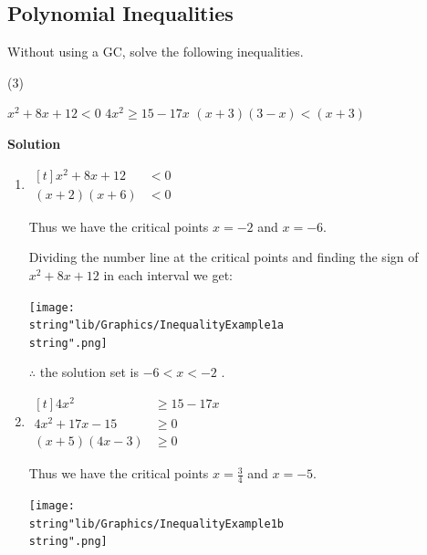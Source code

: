 \documentclass[11pt,a4paper]{book}
\begin{document}
\newpage

\subsection{Polynomial Inequalities}

\begin{example}{}

Without using a GC, solve the following inequalities.

\begin{tasks}[label=(\alph*),label-width=3.5ex](3)

\task $x^{2}+8x+12<0$
\task $4x^{2}\geq15-17x$
\task $\left(x+3\right)\left(3-x\right)<\left(x+3\right)$

\end{tasks}

\textbf{Solution}

\begin{enumerate}[label=(\alph*)]

\item

$
\begin{aligned}[t]
x^{2}+8x+12 & <0\\
\left(x+2\right)\left(x+6\right) & <0
\end{aligned}
$

Thus we have the critical points $x=-2$ and $x=-6$.

Dividing the number line at the critical points and finding the sign
of $x^{2}+8x+12$ in each interval we get:
\begin{center}
\texttt{[image: \\string"lib/Graphics/InequalityExample1a\\string".png]}
\par\end{center}

$\therefore$ the solution set is $-6<x<-2$ .

\item
$
\begin{aligned}[t]
4x^{2} & \geq15-17x\\
4x^{2}+17x-15 & \geq0\\
\left(x+5\right)\left(4x-3\right) & \geq0
\end{aligned}
$

Thus we have the critical points ${\displaystyle x=\frac{3}{4}}$
and $x=-5$.
\begin{center}
\texttt{[image: \\string"lib/Graphics/InequalityExample1b\\string".png]}
\par\end{center}


\end{enumerate}
\end{example}
\end{document}
